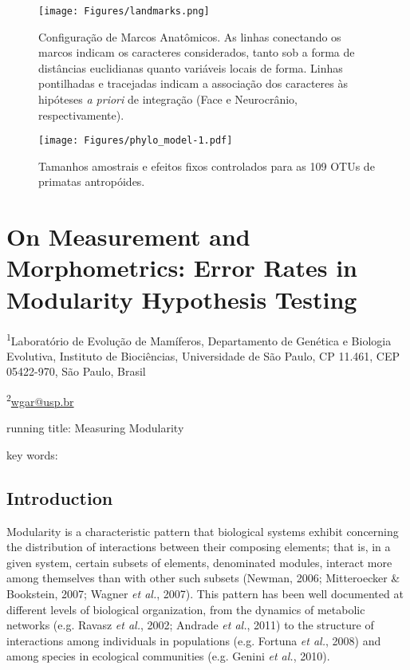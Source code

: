 \documentclass[11pt,twoside]{report}
\begin{document}


\begin{figure}[htbp]
\centering
\texttt{[image: Figures/landmarks.png]}
\caption{Configuração de Marcos Anatômicos. As linhas conectando os
marcos indicam os caracteres considerados, tanto sob a forma de
distâncias euclidianas quanto variáveis locais de forma. Linhas
pontilhadas e tracejadas indicam a associação dos caracteres às
hipóteses \emph{a priori} de integração (Face e Neurocrânio,
respectivamente). \label{fig:landmarks}}
\end{figure}



\begin{figure}[htbp]
\centering
\texttt{[image: Figures/phylo\_model-1.pdf]}
\caption{Tamanhos amostrais e efeitos fixos controlados para as 109 OTUs
de primatas antropóides. \label{fig:phylo_model}}
\end{figure}

\def\sectionautorefname{Section} \def\chapterautorefname{Chapter}
\def\figureautorefname{Figure} \def\tableautorefname{Table}


\newpage
\chapter{On Measurement and Morphometrics: Error Rates in Modularity Hypothesis Testing}
\label{ch:modcomp}

\textsuperscript{1}Laboratório de Evolução de Mamíferos, Departamento de
Genética e Biologia Evolutiva, Instituto de Biociências, Universidade de
São Paulo, CP 11.461, CEP 05422-970, São Paulo, Brasil

\textsuperscript{2}\href{mailto:wgar@usp.br}{wgar@usp.br}

running title: Measuring Modularity

key words:

\section{Introduction}\label{introduction}

Modularity is a characteristic pattern that biological systems exhibit
concerning the distribution of interactions between their composing
elements; that is, in a given system, certain subsets of elements,
denominated modules, interact more among themselves than with other such
subsets (Newman, 2006; Mitteroecker \& Bookstein, 2007; Wagner \emph{et
al.}, 2007). This pattern has been well documented at different levels
of biological organization, from the dynamics of metabolic networks
(e.g. Ravasz \emph{et al.}, 2002; Andrade \emph{et al.}, 2011) to the
structure of interactions among individuals in populations (e.g. Fortuna
\emph{et al.}, 2008) and among species in ecological communities (e.g.
Genini \emph{et al.}, 2010).
\end{document}
